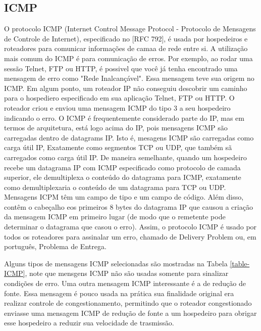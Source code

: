 \documentclass[
	article,			%
	11pt,				%
	oneside,			%
	a4paper,			%
	section=TITLE,		%
	english,			%
	brazil,				%
	sumario=tradicional
	]{abntex2}
\begin{document}
\subsection{ICMP}
 O protocolo ICMP (Internet Control Message Protocol - Protocolo de Mensagens de Controle de Internet), especificado no [RFC 792], é usada por hospedeiros e roteadores para comunicar informaç\~oes de camaa de rede entre si. A utilização mais comum do ICMP é para comunicação de erros. Por exemplo, ao rodar uma sessão Telnet, FTP ou HTTP, é possivel que você já tenha encontrado uma mensagem de erro como "Rede Inalcançável". Essa mensagem teve sua origem no ICMP. Em algum ponto, um roteador IP não conseguiu descobrir um caminho para o hospediero especificado em sua aplicação Telnet, FTP ou HTTP. O roteador criou e enviou uma mensagem ICMP do tipo 3 a seu hospedeiro indicando o erro.
 O ICMP é frequentemente considerado parte do IP, mas em termos de arquitetura, está logo acima do IP, pois mensagens ICMP são carregadas dentro de datagrams IP. Isto é, mesagens ICMP são carregadas como carga útil IP, Exatamente como segmentos TCP ou UDP, que também sã carregados como carga útil IP. De maneira semelhante, quando um hospedeiro recebe um datagrama IP com ICMP especificado como protocolo de camada superior, ele demultiplexa o conteúdo do datagrama para ICMP, exatamente como demultiplexaria o conteúdo de um datagrama para TCP ou UDP.
 Mensagens ICPM têm um campo de tipo e um campo de código. Além disso, contêm o cabeçalho eos primeiros 8 bytes do datagrama IP que causou a criação da mensagem ICMP em primeiro lugar (de modo que o remetente pode determinar o datagrama que casou o erro). Assim, o protocolo ICMP é usado por todos os roteadores para assinalar um erro, chamado de Delivery Problem ou, em português, Problema de Entrega. \cite{Kurose}
 
 Alguns tipos de mensagens ICMP selecionadas são mostradas na Tabela \ref{table-ICMP}, note que mensgens ICMP não são usadas somente para sinalizar condições de erro.
 Uma outra mensagem ICMP interessante é a de redução de fonte. Essa mensagem é pouco usada na prática sua finalidade original era realizar controle de congestionamento, permitindo que o roteador congestionado enviasse uma mensagem ICMP de redução de fonte a um hospedeiro para obrigar esse hospedeiro a reduzir sua velocidade de trasmissão.
 
\end{document}
